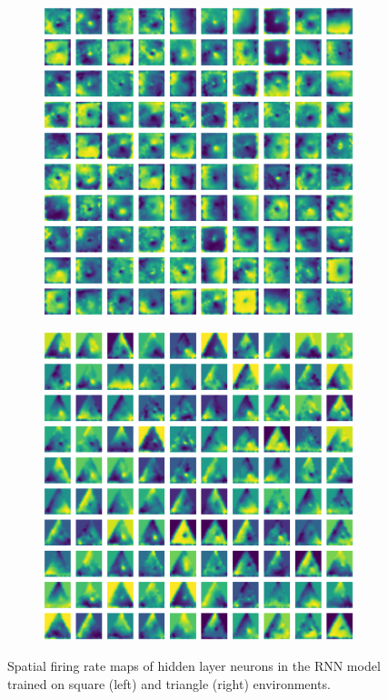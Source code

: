 \documentclass{article}
\begin{document}
\begin{figure}[h]
  \centering
  \begin{subfigure}{0.49\textwidth}
    \includegraphics[width=0.99\textwidth, left]{figures/rnn_square_neuron_spatial_maps.png}  
  \end{subfigure}
  \begin{subfigure}{0.49\textwidth}
    \includegraphics[width=0.99\textwidth, right]{figures/rnn_triangle_neuron_spatial_maps.png}
  \end{subfigure}
  \caption{Spatial firing rate maps of hidden layer neurons in the RNN model trained on square (left) and triangle (right) environments.}
  \label{fig:square_neuron_maps}
\end{figure}
\end{document}
